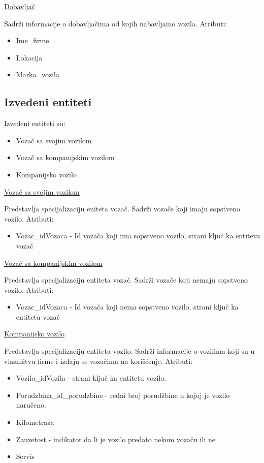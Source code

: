 \begin{flushleft}
\underline{Dobavljač}
\end{flushleft}
Sadrži informacije o dobavljačima od kojih nabavljamo vozila. Atributi:
\begin{itemize}
    \item Ime\_firme
    \item Lokacija
    \item Marka\_vozila
\end{itemize}


\subsection{\textbf{Izvedeni entiteti}}
Izvedeni entiteti su:
\begin{itemize}
    \item Vozač sa svojim vozilom
    \item Vozač sa kompanijskim vozilom
    \item Kompanijsko vozilo
\end{itemize}

\begin{flushleft}
\underline{Vozač sa svojim vozilom}
\end{flushleft}
Predstavlja specijalizaciju eniteta vozač. Sadrži vozače koji imaju sopstveno vozilo. Atributi:
\begin{itemize}
    \item Vozac\_idVozaca - Id vozača koji ima sopstveno vozilo, strani ključ ka entitetu vozač
\end{itemize}

\begin{flushleft}
\underline{Vozač sa kompanijskim vozilom}
\end{flushleft}
Predstavlja specijalizaciju entiteta vozač. Sadrži vozače koji nemaju sopstveno vozilo. Atributi:
\begin{itemize}
    \item Vozac\_idVozaca - Id vozača koji nema sopstveno vozilo, strani ključ ka entitetu vozač
\end{itemize}

\begin{flushleft}
\underline{Kompanijsko vozilo}
\end{flushleft}
Predstavlja specijalizaciju entiteta vozilo. Sadrži informacije o vozilima koji su u vlasništvu firme i izdaju se vozačima na korišćenje. Atributi:
\begin{itemize}
    \item Vozilo\_idVozila - strani ključ ka entitetu vozilo.
    \item Porudzbina\_id\_porudzbine - redni broj porudžbine u kojoj je vozilo naručeno.
    \item Kilometraza
    \item Zauzetost - indikator da li je vozilo predato nekom vozaču ili ne
    \item Servis
\end{itemize}


